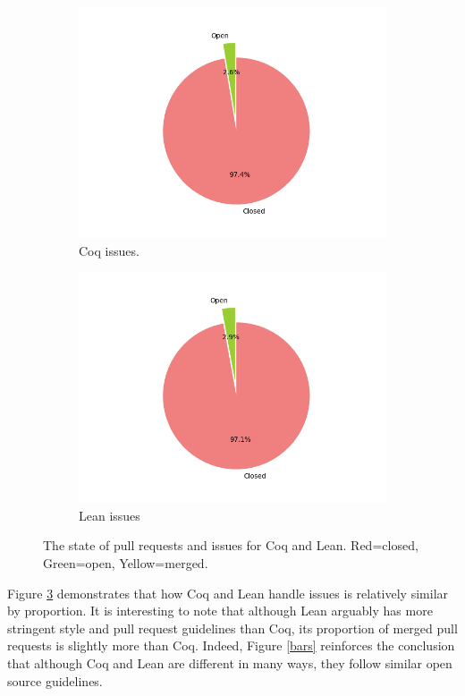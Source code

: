 \documentclass[sigconf,nonacm]{acmart}
\begin{document}
\begin{figure}[H]
\begin{subfigure}{0.45\columnwidth}
    \includegraphics[width=\linewidth]{coq_isuses_state.png}
    \caption{Coq issues.}
    \label{coq issues}
  \end{subfigure}
  \hfill %
  \begin{subfigure}{0.45\columnwidth}
    \includegraphics[width=\linewidth]{lean_isuses_state.png}
    \caption{Lean issues}
    \label{lean prs}
  \end{subfigure}
  \caption{The state of pull requests and issues for Coq and Lean. Red=closed, Green=open, Yellow=merged.}
  \label{circles}
\end{figure}

Figure \ref{circles} demonstrates that how Coq and Lean handle issues is relatively similar by proportion. It is interesting to note that although Lean arguably has more stringent style and pull request guidelines than Coq, its proportion of merged pull requests is slightly more than Coq. Indeed, Figure \ref{bars} reinforces the conclusion that although Coq and Lean are different in many ways, they follow similar open source guidelines.
\end{document}
